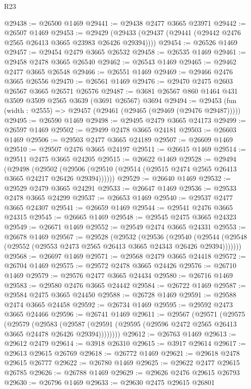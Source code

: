 \begin{lexlean}{R23}
\begin{coremodule}
@29438 := @26500 @1469
@29441 := @29438 @2477 @3665 @23971
@29442 := @26507 @1469
@29453 := @29429 (@29433 (@29437 (@29441 (@29442 @2476 @2565 @26413 @3665 @23983 @26426 @29394))))
@29454 := @26526 @1469
@29457 := @29454 @2479 @3665 @26532
@29458 := @26535 @1469
@29461 := @29458 @2478 @3665 @26540
@29462 := @26543 @1469
@29465 := @29462 @2477 @3665 @26548
@29466 := @26551 @1469
@29469 := @29466 @2476 @3665 @26556
@29470 := @26561 @1469
@29476 := @29470 @2475 @2603 @26567 @3665 @26571 @26576
@29487 := @3681 @26567 @860 @1464 @431 @3509 @3509 @2565 @3639 (@3691 @26567) @3694
@29494 := @29453 (fun (width : @2555) => @29457 (@29461 (@29465 (@29469 (@29476 @29487)))))
@29495 := @26590 @1469
@29498 := @29495 @2479 @3665 @24173
@29499 := @26597 @1469
@29502 := @29499 @2478 @3665 @24181
@29503 := @26603 @1469
@29506 := @29503 @2477 @3665 @24189
@29507 := @26609 @1469
@29510 := @29507 @2476 @3665 @24197
@29511 := @26615 @1469
@29514 := @29511 @2475 @3665 @24205
@29515 := @26622 @1469
@29528 := @29494
    (@29498
      (@29502 (@29506 (@29510 (@29514 (@29515 @2474 @2565 @26413 @3665 @24217 @26426 @29394))))))
@29529 := @26640 @1469
@29532 := @29529 @2479 @3665 @24291
@29533 := @26647 @1469
@29536 := @29533 @2478 @3665 @24299
@29537 := @26653 @1469
@29540 := @29537 @2477 @3665 @24307
@29541 := @26659 @1469
@29544 := @29541 @2476 @3665 @24315
@29545 := @26665 @1469
@29548 := @29545 @2475 @3665 @24323
@29549 := @26671 @1469
@29552 := @29549 @2474 @3665 @24331
@29553 := @26678 @1469
@29567 := @29528
    (@29532
      (@29536
        (@29540 (@29544 (@29548 (@29552 (@29553 @2473 @2565 @26413 @3665 @24343 @26426 @29394)))))))
@29568 := @26697 @1469
@29571 := @29568 @2479 @3665 @24418
@29572 := @26704 @1469
@29575 := @29572 @2478 @3665 @24426
@29576 := @26710 @1469
@29579 := @29576 @2477 @3665 @24434
@29580 := @26716 @1469
@29583 := @29580 @2476 @3665 @24442
@29584 := @26722 @1469
@29587 := @29584 @2475 @3665 @24450
@29588 := @26728 @1469
@29591 := @29588 @2474 @3665 @24458
@29592 := @26734 @1469
@29595 := @29592 @2473 @3665 @24466
@29596 := @26741 @1469
@29611 := @29567
    (@29571
      (@29575
        (@29579
          (@29583
            (@29587 (@29591 (@29595 (@29596 @2472 @2565 @26413 @3665 @24478 @26426 @29394))))))))
@29612 := @26763 @1469
@29613 := @29612 @2479
@29614 := @3918 @26310
@29615 := @3917 @29614
@29617 := @29613 @29615 @26769
@29618 := @26772 @1469
@29621 := @29618 @2478 @29615 @26777
@29622 := @26780 @1469
@29625 := @29622 @2477 @29615 @26785
@29626 := @26788 @1469
@29629 := @29626 @2476 @29615 @26793
@29630 := @26796 @1469
@29633 := @29630 @2475 @29615 @26801

\end{coremodule}
\end{lexlean}
